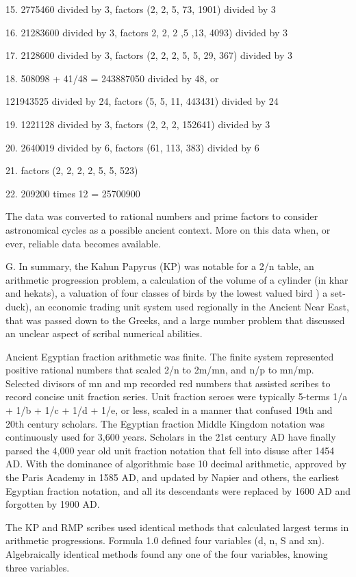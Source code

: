 \documentclass[12pt]{article}
\begin{document}
15. 2775460 divided by 3, factors (2, 2, 5, 73, 1901) divided by 3

16. 21283600 divided by 3, factors 2, 2, 2 ,5 ,13, 4093) divided by 3

17. 2128600 divided by 3, factors  (2, 2, 2, 5, 5, 29, 367) divided by 3

18. 508098 + 41/48 = 243887050 divided by 48, or

  121943525 divided by 24, factors (5, 5, 11, 443431) divided by 24

19. 1221128 divided by 3, factors (2, 2, 2, 152641) divided by 3

20. 2640019 divided by 6, factors (61, 113, 383) divided by 6

21. factors (2, 2, 2, 2, 5, 5, 523)

22. 209200 times 12 = 25700900

The data was converted to rational numbers and prime factors to consider astronomical cycles as a possible ancient context. More on this data when, or ever, reliable data becomes available.   

G. In summary, the Kahun Papyrus (KP) was notable for a 2/n table, an arithmetic progression problem, a calculation of the volume of a cylinder (in khar and hekats), a valuation of four classes of birds by the lowest valued bird ) a set-duck), an economic trading unit system used regionally in the Ancient Near East, that was passed down to the Greeks, and a large number problem that discussed an unclear aspect of scribal numerical abilities. 

Ancient Egyptian fraction arithmetic was finite. The finite system represented positive rational numbers that scaled 2/n to 2m/mn, and n/p to mn/mp. Selected divisors of mn and mp recorded red numbers that assisted scribes to record concise unit fraction series. Unit fraction seroes were typically 5-terms 1/a + 1/b + 1/c + 1/d + 1/e, or less, scaled in a manner that confused 19th and 20th century scholars. The Egyptian fraction Middle Kingdom notation was continuously used for 3,600 years. Scholars in the 21st century AD have finally parsed the 4,000 year old unit fraction notation that fell into disuse after 1454 AD. With the dominance of algorithmic base 10 decimal arithmetic, approved by the Paris Academy in 1585 AD, and updated by Napier and others, the earliest Egyptian fraction notation, and all its  descendants were replaced by 1600 AD and forgotten by 1900 AD.

The KP and RMP scribes used identical methods that calculated largest terms in arithmetic progressions. Formula 1.0 defined four variables (d, n, S and xn). Algebraically identical methods found any one of the four variables, knowing three variables.
 
\end{document}
